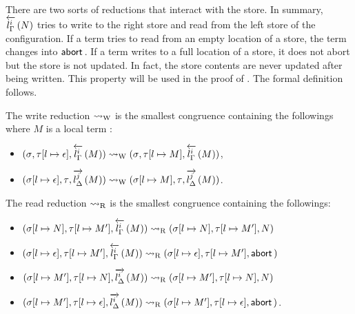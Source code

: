 {There are two sorts of reductions that interact with the store.
In summary, $\rtol i l \Gamma N$ tries to write to the right store and read from
the left store of the configuration.
If a term tries to read from an empty location of a store,
the term changes into $\abort$.  If a term writes to a full location of
a store, it does not abort but the store is not updated.  In fact, the
store contents are never updated after being written.
This property will be used in the proof of .
The formal definition follows.
\begin{definition}
 The write reduction $\wreduce$ is the smallest congruence
 containing the followings where $M$ is a local term :
 \begin{itemize}
  \item $\conf{}{[l\mapsto\epsilon]}{\rtol i l \Gamma M}
	\wreduce
	\conf{}{[l\mapsto M]}{\rtol i l \Gamma M}
	$\enspace,
  \item $\conf{[l\mapsto\epsilon]}{}{\ltor j l \Delta M}
	\wreduce
	\conf{[l\mapsto M]}{}{\ltor j l \Delta M}
	$\enspace.
 \end{itemize}
\end{definition}

\begin{definition}
 \label{read}
 The read reduction $\rreduce$ is the smallest congruence
 containing the
 followings:
\begin{itemize}
 \item  $\conf{[l\mapsto {N}]}{[l\mapsto M']}{\rtol i l\Gamma M}\rreduce
	\conf{[l\mapsto {N}]}{[l\mapsto M']}{N}$
 \item  $\conf{[l\mapsto \epsilon]}
	{[l\mapsto M']}{\rtol i l\Gamma M}\rreduce
	\conf{[l\mapsto \epsilon]}{[l\mapsto M']}{\abort}$
 \item  $\conf{[l\mapsto M']}{[l\mapsto {N}]}{\ltor i l \Delta M}\rreduce
	\conf{[l\mapsto M']}{[l\mapsto {N}]}{N}$
 \item  $\conf{[l\mapsto M']}{[l\mapsto \epsilon]}{\ltor i l \Delta M}\rreduce
	 \conf{[l\mapsto M']}{[l\mapsto \epsilon]}{\abort}$\enspace .
\end{itemize}
\end{definition}

}
